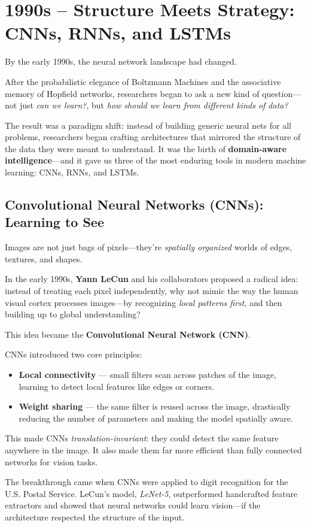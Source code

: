 \section{1990s – Structure Meets Strategy: CNNs, RNNs, and LSTMs}

By the early 1990s, the neural network landscape had changed.

After the probabilistic elegance of Boltzmann Machines and the associative memory of Hopfield networks, researchers began to ask a new kind of question—not just \emph{can we learn?}, but \emph{how should we learn from different kinds of data?}

The result was a paradigm shift: instead of building generic neural nets for all problems, researchers began crafting architectures that mirrored the structure of the data they were meant to understand. It was the birth of \textbf{domain-aware intelligence}—and it gave us three of the most enduring tools in modern machine learning: CNNs, RNNs, and LSTMs.

\subsection{Convolutional Neural Networks (CNNs): Learning to See}

Images are not just bags of pixels—they're \emph{spatially organized} worlds of edges, textures, and shapes.

In the early 1990s, \textbf{Yann LeCun} and his collaborators proposed a radical idea: instead of treating each pixel independently, why not mimic the way the human visual cortex processes images—by recognizing \emph{local patterns first}, and then building up to global understanding?

This idea became the \textbf{Convolutional Neural Network (CNN)}.

CNNs introduced two core principles:

\begin{itemize}
  \item \textbf{Local connectivity} — small filters scan across patches of the image, learning to detect local features like edges or corners.
  \item \textbf{Weight sharing} — the same filter is reused across the image, drastically reducing the number of parameters and making the model spatially aware.
\end{itemize}

This made CNNs \emph{translation-invariant}: they could detect the same feature anywhere in the image. It also made them far more efficient than fully connected networks for vision tasks.

The breakthrough came when CNNs were applied to digit recognition for the U.S. Postal Service. LeCun’s model, \textit{LeNet-5}, outperformed handcrafted feature extractors and showed that neural networks could learn vision—if the architecture respected the structure of the input.
